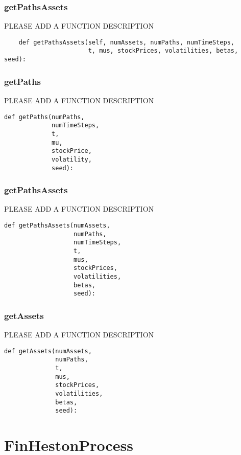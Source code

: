 \documentclass[twoside,11pt]{book}
\begin{document}
\subsubsection*{{\bf getPathsAssets}}
PLEASE ADD A FUNCTION DESCRIPTION

\begin{lstlisting}
    def getPathsAssets(self, numAssets, numPaths, numTimeSteps,
                       t, mus, stockPrices, volatilities, betas, seed):
\end{lstlisting}

\subsubsection*{{\bf getPaths}}
PLEASE ADD A FUNCTION DESCRIPTION

\begin{lstlisting}
def getPaths(numPaths,
             numTimeSteps,
             t,
             mu,
             stockPrice,
             volatility,
             seed):
\end{lstlisting}

\subsubsection*{{\bf getPathsAssets}}
PLEASE ADD A FUNCTION DESCRIPTION

\begin{lstlisting}
def getPathsAssets(numAssets,
                   numPaths,
                   numTimeSteps,
                   t,
                   mus,
                   stockPrices,
                   volatilities,
                   betas,
                   seed):
\end{lstlisting}

\subsubsection*{{\bf getAssets}}
PLEASE ADD A FUNCTION DESCRIPTION

\begin{lstlisting}
def getAssets(numAssets,
              numPaths,
              t,
              mus,
              stockPrices,
              volatilities,
              betas,
              seed):
\end{lstlisting}

\newpage
\section{FinHestonProcess}
\end{document}
